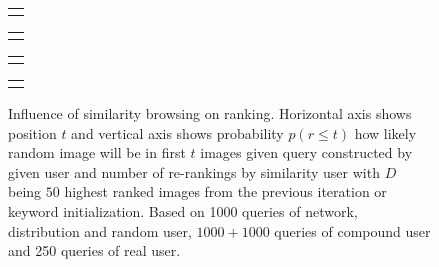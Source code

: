 \begin{figure}[h]
	\centering
	\begin{tabular}{@{}c@{}}
		\subfloat{
			
		}
	\end{tabular}
	\begin{tabular}{@{}c@{}}
		\subfloat{
			
		}
	\end{tabular}
	\begin{tabular}{@{}c@{}}
		\subfloat{
			
		}
	\end{tabular}
	\begin{tabular}{@{}c@{}}
		\subfloat{
			
		}
	\end{tabular}
	
	
	\caption[Influence of similarity browsing on ranking]{Influence of similarity browsing on ranking. Horizontal axis shows position $t$ and vertical axis shows probability $p(r\leq t)$ how likely random image will be in first $t$ images given query constructed by given user and number of re-rankings by similarity user with $D$ being $50$ highest ranked images from the previous iteration or keyword initialization. Based on 1000 queries of network, distribution and random user, $1000+1000$ queries of compound user and 250 queries of real user.}
	\label{fig:simulation_rerank}
\end{figure}
